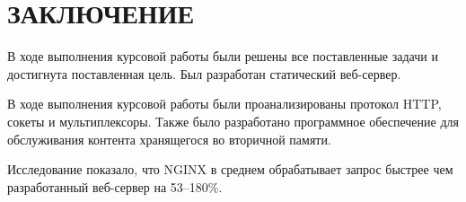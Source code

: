 \chapter*{ЗАКЛЮЧЕНИЕ}


В ходе выполнения курсовой работы были решены все поставленные задачи и достигнута поставленная цель. Был разработан статический веб-сервер.

В ходе выполнения курсовой работы были проанализированы протокол HTTP, сокеты и мультиплексоры. Также было разработано программное обеспечение для обслуживания контента хранящегося во вторичной памяти.

Исследование показало, что NGINX в среднем обрабатывает запрос быстрее чем разработанный веб-сервер на 53--180\%.




